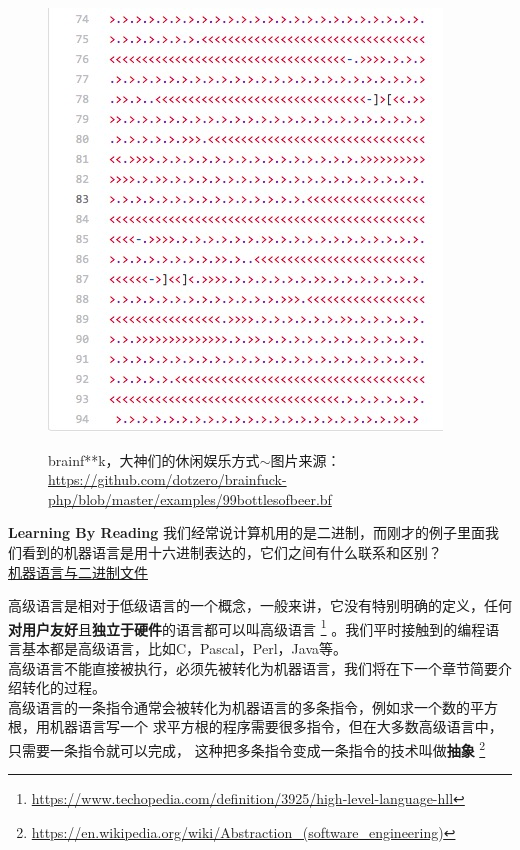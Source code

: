 \begin{figure}[htb]
\centering\includegraphics{image/brainfuck.png}\\
\caption{brainf**k，大神们的休闲娱乐方式$\sim$图片来源：\url{https://github.com/dotzero/brainfuck-php/blob/master/examples/99bottlesofbeer.bf}}\label{fig.brainfuck}
\end{figure}
\begin{paperbox}{\textbf{Learning By Reading}\starone}
我们经常说计算机用的是二进制，而刚才的例子里面我们看到的机器语言是用十六进制表达的，它们之间有什么联系和区别？\\
\href{https://stackoverflow.com/questions/21571709/difference-between-machine-language-binary-code-and-a-binary-file}{机器语言与二进制文件}
\end{paperbox}
高级语言是相对于低级语言的一个概念，一般来讲，它没有特别明确的定义，任何\textbf{对用户友好}且\textbf{独立于硬件}的语言都可以叫高级语言
\footnote{\url{https://www.techopedia.com/definition/3925/high-level-language-hll}}
。我们平时接触到的编程语言基本都是高级语言，比如C，Pascal，Perl，Java等。\\
高级语言不能直接被执行，必须先被转化为机器语言，我们将在下一个章节简要介绍转化的过程。\\
高级语言的一条指令通常会被转化为机器语言的多条指令，例如求一个数的平方根，用机器语言写一个
求平方根的程序需要很多指令，但在大多数高级语言中，只需要一条指令就可以完成，
这种把多条指令变成一条指令的技术叫做\textbf{抽象}
\footnote{\url{https://en.wikipedia.org/wiki/Abstraction_(software_engineering)}}
